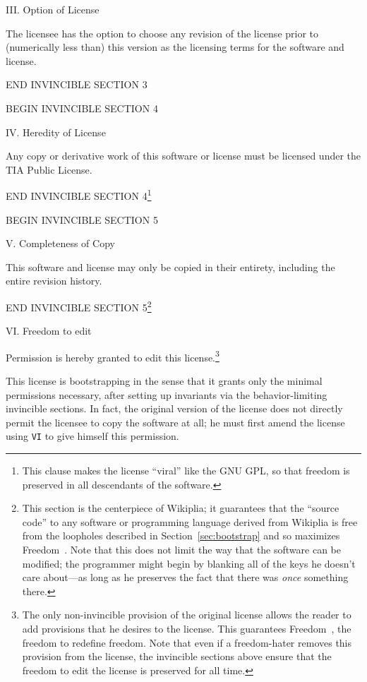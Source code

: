 \documentclass[twocolumn]{article}
\begin{document}
{III. Option of License

The licensee has the option to choose any revision of the license
prior to (numerically less than) this version as the licensing
terms for the software and license.

END INVINCIBLE SECTION 3

BEGIN INVINCIBLE SECTION 4

IV. Heredity of License

Any copy or derivative work of this software or license must be
licensed under the TIA Public License.

END INVINCIBLE SECTION 4\footnote{This clause makes the license
``viral'' like the GNU GPL, so that freedom is preserved in all
descendants of the software.}

BEGIN INVINCIBLE SECTION 5

V. Completeness of Copy

This software and license may only be copied in their entirety,
including the entire revision history.

END INVINCIBLE SECTION 5\footnote{This section is the centerpiece of
Wikiplia; it guarantees that the ``source code'' to any software or
programming language derived from Wikiplia is free from the loopholes
described in Section~\ref{sec:bootstrap} and so maximizes
Freedom~\ftinker. Note that this does not limit the way that the
software can be modified; the programmer might begin by blanking all
of the keys he doesn't care about---as long as he preserves the fact
that there was {\em once} something there.}

VI. Freedom to edit

Permission is hereby granted to edit this license.\footnote{The only
non-invincible provision of the original license allows the reader to
add provisions that he desires to the license. This guarantees
Freedom~\ffree, the freedom to redefine freedom.
%
Note that even if a freedom-hater removes this provision from the
license, the invincible sections above ensure that the freedom to edit
the license is preserved for all time.}

}

\bigskip
This license is bootstrapping in the sense that it grants only the
minimal permissions necessary, after setting up invariants via the
behavior-limiting invincible sections. In fact, the original version
of the license does not directly permit the licensee to copy the
software at all; he must first amend the license using {\tt VI} to
give himself this permission.
\end{document}
